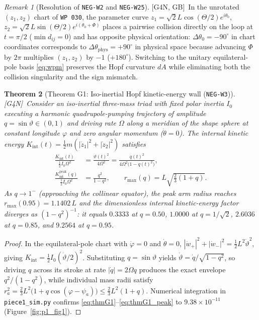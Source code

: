 \documentclass[11pt]{amsart}
\numberwithin{equation}{section}
\theoremstyle{plain}
\newtheorem{theorem}{Theorem}[section]
\theoremstyle{definition}\newtheorem{definition}[theorem]{Definition}
\theoremstyle{remark}\newtheorem{remark}[theorem]{Remark}
\newcommand{\ctag}[1]{\textup{\textsf{\scriptsize[#1]}}}
\begin{document}
\begin{remark}[Resolution of \texttt{NEG-W2} and \texttt{NEG-W25}]
\ctag{G4N, GB}\ In the unrotated $(z_1, z_2)$ chart of \texttt{WP~030}, the parameter curve $z_1 = \sqrt{2}L \cos(\Theta/2) e^{i\theta_0}$, $z_2 = \sqrt{2}L \sin(\Theta/2) e^{i(\theta_0 + \Phi)}$ places a pairwise collision directly on the loop at $t = \pi/2$ ($\min d_{ij} = 0$) and has opposite physical orientation: $\Delta\theta_0 = -90^\circ$ in chart coordinates corresponds to $\Delta\theta_{\mathrm{phys}} = +90^\circ$ in physical space because advancing $\Phi$ by $2\pi$ multiplies $(z_1, z_2)$ by $-1$ ($+180^\circ$). Switching to the unitary equilateral-pole basis \eqref{eq:wpm} preserves the Hopf curvature $dA$ while eliminating both the collision singularity and the sign mismatch.
\end{remark}

\begin{theorem}[Theorem G1: Iso-inertial Hopf kinetic-energy wall (\texttt{NEG-W3})]\label{thm:G1}
\ctag{G4N}\ Consider an iso-inertial three-mass triad with fixed polar inertia $I_0$ executing a harmonic quadrupole-pumping trajectory of amplitude $q = \sin\vartheta \in (0,1)$ and driving rate $\Omega$ along a meridian of the shape sphere at constant longitude $\varphi$ and zero angular momentum ($\dot{\theta} = 0$). The internal kinetic energy $K_{\mathrm{int}}(t) = \frac12 m(|\dot{z}_1|^2 + |\dot{z}_2|^2)$ satisfies
\begin{align}\label{eq:thmG1}
\frac{K_{\mathrm{int}}(t)}{\frac12 I_0 \Omega^2} &= \frac{\dot{\vartheta}(t)^2}{4\Omega^2} = \frac{\dot{q}(t)^2}{4\Omega^2\bigl(1 - q(t)^2\bigr)}, \\
\frac{K_{\mathrm{int}}^{\mathrm{peak}}(q)}{\frac12 I_0 \Omega^2} &= \frac{q^2}{1 - q^2}, \qquad r_{\max}(q) = L\sqrt{\frac23(1 + q)}. \label{eq:thmG1_peak}
\end{align}
As $q \to 1^-$ (approaching the collinear equator), the peak arm radius reaches $r_{\max}(0.95) = 1.1402\,L$ and the dimensionless internal kinetic-energy factor diverges as $(1 - q^2)^{-1}$: it equals $0.3333$ at $q=0.50$, $1.0000$ at $q = 1/\sqrt{2}$, $2.6036$ at $q = 0.85$, and $9.2564$ at $q = 0.95$.
\end{theorem}
\begin{proof}
In the equilateral-pole chart with $\dot{\varphi} = 0$ and $\dot{\theta} = 0$, $|\dot{w}_+|^2 + |\dot{w}_-|^2 = \frac{1}{2}L^2\dot{\vartheta}^2$, giving $K_{\mathrm{int}} = \frac12 I_0 (\dot{\vartheta}/2)^2$. Substituting $q = \sin\vartheta$ yields $\dot{\vartheta} = \dot{q}/\sqrt{1-q^2}$, so driving $q$ across its stroke at rate $|\dot{q}| = 2\Omega q$ produces the exact envelope $q^2/(1-q^2)$, while individual mass radii satisfy $r_a^2 = \frac23 L^2\bigl(1 + q \cos(\varphi - \psi_a)\bigr) \le \frac23 L^2(1+q)$. Numerical integration in \texttt{piece1\_sim.py} confirms \eqref{eq:thmG1}--\eqref{eq:thmG1_peak} to $9.38\times 10^{-11}$ (Figure~\ref{fig:p1_fig1}).
\end{proof}
\end{document}
